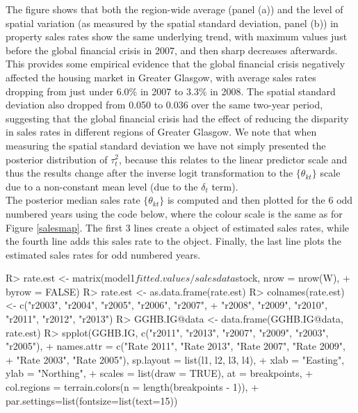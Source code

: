\documentclass[article, nojss]{jss}
\begin{document}
The figure shows that both the region-wide average (panel (a)) and the level of spatial variation (as measured by the spatial standard deviation, panel (b)) in property sales rates show the same underlying trend, with maximum values just before the global financial crisis in 2007, and then sharp decreases afterwards. This provides some empirical evidence that the global financial crisis negatively affected the housing market in Greater Glasgow, with average sales rates dropping from just under 6.0\% in 2007 to 3.3\% in 2008. The spatial standard deviation also dropped from 0.050 to 0.036 over the same two-year period, suggesting that the global financial crisis had the effect of reducing the disparity in sales rates in different regions of Greater Glasgow. We note that when measuring the spatial standard deviation we have not simply presented the posterior distribution of $\tau^{2}_{t}$, because this relates to the linear predictor scale and thus the results change after the inverse logit transformation to the $\{\theta_{kt}\}$ scale due to a non-constant mean level (due to the $\delta_t$ term).\\

The posterior median sales rate $\{\theta_{kt}\}$ is computed and then plotted for the 6 odd numbered years using the code below, where the colour scale is the same as for Figure \ref{salesmap}. The first 3 lines create a  object of estimated sales rates, while the fourth line adds this sales rate to the  object. Finally, the last line plots the estimated sales rates for odd numbered years.

\begin{CodeInput}
R> rate.est <- matrix(model1$fitted.values / salesdata$stock, nrow = nrow(W), 
+    byrow = FALSE)
R> rate.est <- as.data.frame(rate.est)
R> colnames(rate.est) <- c("r2003", "r2004", "r2005", "r2006", "r2007", 
+    "r2008", "r2009", "r2010", "r2011", "r2012", "r2013")
R> GGHB.IG@data <- data.frame(GGHB.IG@data, rate.est)
R> spplot(GGHB.IG, c("r2011", "r2013", "r2007", "r2009", "r2003", "r2005"), 
+    names.attr = c("Rate 2011", "Rate 2013", "Rate 2007", "Rate 2009", 
+    "Rate 2003", "Rate 2005"), sp.layout = list(l1, l2, l3, l4), 
+    xlab = "Easting", ylab = "Northing", 
+    scales = list(draw = TRUE), at = breakpoints, 
+    col.regions = terrain.colors(n = length(breakpoints - 1)),
+    par.settings=list(fontsize=list(text=15))
\end{CodeInput}
\end{document}
